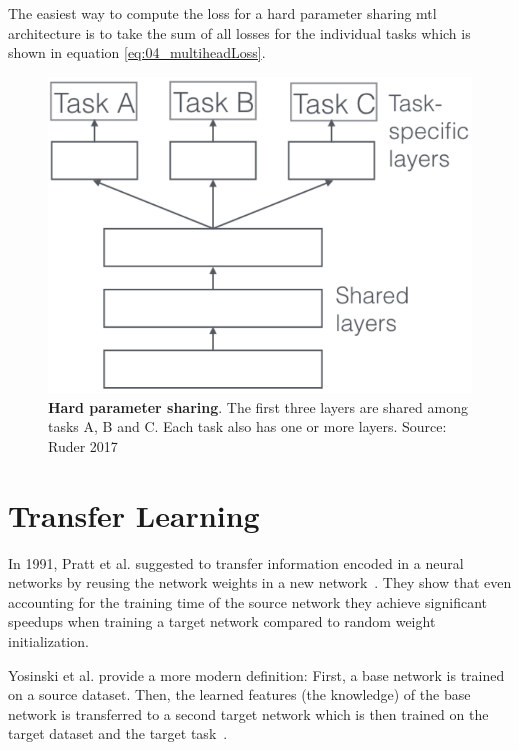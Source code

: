 The easiest way to compute the loss for a hard parameter sharing \gls{mtl} architecture is to take the sum of all losses for the individual tasks which is shown in equation \ref{eq:04_multiheadLoss}.

\begin{figure}[ht]
    \centering
    \includegraphics[scale=0.5]{figures/03_theory/03_mtl_architecture}
    \caption{\textbf{Hard parameter sharing}. The first three layers are shared among tasks A, B and C. Each task also has one or more layers. Source: Ruder 2017~\cite{Ruder2017}}
    \label{fig:03_mtl_architecture}
\end{figure}

\section{Transfer Learning}
\label{sec:TransferLearning}

In 1991, Pratt et al. suggested to transfer information encoded in a neural networks by reusing the network weights in a new network~\cite{Pratt1991}. They show that even accounting for the training time of the source network they achieve significant speedups when training a target network compared to random weight initialization.
\medskip

Yosinski et al. provide a more modern definition: First, a base network is trained on a source dataset. Then, the learned features {(the knowledge)} of the base network is transferred to a second target network which is then trained on the target dataset and the target task~\cite{Yosinski2014}. 

